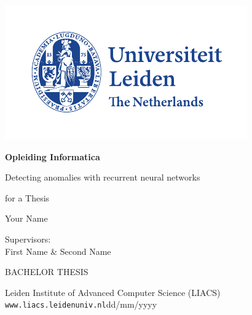\thispagestyle{empty}

\includegraphics{logoleiden}

\vspace{-2.5cm}\hfill \begin{huge}\textbf{Opleiding Informatica}\end{huge}

\vspace{5cm}
\begin{Large}
\hfill Detecting anomalies with recurrent neural networks

\vspace*{3mm}

\hfill for a Thesis

\vspace*{14mm}

\hfill Your Name
\end{Large}

\vspace*{4.5cm}

\begin{large}

Supervisors:\\
First Name \& Second Name


\vspace*{2.8cm}
BACHELOR THESIS

\vspace*{5mm}
Leiden Institute of Advanced Computer Science (LIACS)\\
\texttt{www.liacs.leidenuniv.nl}\hfill dd/mm/yyyy
\end{large}

